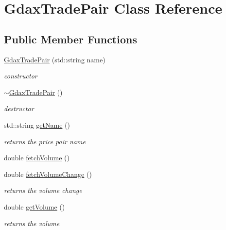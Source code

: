 \hypertarget{class_gdax_trade_pair}{}\section{Gdax\+Trade\+Pair Class Reference}
\label{class_gdax_trade_pair}
\subsection*{Public Member Functions}
\begin{DoxyCompactItemize}
\item 
\mbox{\label{class_gdax_trade_pair_acf77c357616ceb25a568f6dc8196aee5}} 
\mbox{\hyperlink{class_gdax_trade_pair_acf77c357616ceb25a568f6dc8196aee5}{Gdax\+Trade\+Pair}} (std\+::string name)
\begin{DoxyCompactList}\small\item\em constructor \end{DoxyCompactList}\item 
\mbox{\label{class_gdax_trade_pair_a72fe524fa389f64179a595e9e90fc5fc}} 
\mbox{\hyperlink{class_gdax_trade_pair_a72fe524fa389f64179a595e9e90fc5fc}{$\sim$\+Gdax\+Trade\+Pair}} ()
\begin{DoxyCompactList}\small\item\em destructor \end{DoxyCompactList}\item 
std\+::string \mbox{\hyperlink{class_gdax_trade_pair_ac67b487345149920a4631b3b2517033f}{get\+Name}} ()
\begin{DoxyCompactList}\small\item\em returns the price pair name \end{DoxyCompactList}\item 
double \mbox{\hyperlink{class_gdax_trade_pair_ad7799585f8c7e06792da997cc53966b5}{fetch\+Volume}} ()
\item 
double \mbox{\hyperlink{class_gdax_trade_pair_ab4bc3b56207898507dd1ea0b2a4d3954}{fetch\+Volume\+Change}} ()
\begin{DoxyCompactList}\small\item\em returns the volume change \end{DoxyCompactList}\item 
double \mbox{\hyperlink{class_gdax_trade_pair_ac1690b5bfce51854585ea1c9288250e6}{get\+Volume}} ()
\begin{DoxyCompactList}\small\item\em returns the volume \end{DoxyCompactList}\item 

\end{DoxyCompactItemize}

